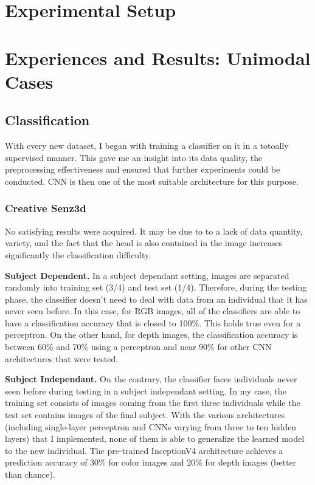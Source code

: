 \section{Experimental Setup}

\section{Experiences and Results: Unimodal Cases}

\subsection{Classification}

With every new dataset, I began with training a classifier on it in a
totoally supervised manner.
This gave me an insight into its data quality, the preprocessing
effectiveness and ensured that further experiments could be conducted.
CNN is then one of the most suitable architecture for this purpose.

\subsubsection{Creative Senz3d}

No satisfying results were acquired. It may be due to to a lack of data
quantity, variety, and the fact that the head is also contained in the
image increases significantly the classification difficulty.

\textbf{Subject Dependent.}
In a subject dependant setting, images are separated randomly into
training set (3/4) and test set (1/4). Therefore, during the
testing phase, the classifier doesn't need to deal with data from an
individual that it has never seen before.
In this case, for RGB images, all of the classifiers are able to
have a classification accuracy that is closed to 100\%. This holds true
even for a perceptron.
On the other hand, for depth images, the classification accuracy is
between 60\% and 70\% using a perceptron and near 90\% for other CNN
architectures that were tested.

\textbf{Subject Independant.}
On the contrary, the classifier faces individuals never seen before
during testing in a subject independant setting. 
In my case, the training set consists of images coming from the
first three individuals while the test set contains images of
the final subject.
With the various architectures (including single-layer perceptron
and CNNs varying from three to ten hidden layers)
that I implemented, none of them is able to generalize the learned model
to the new individual.
The pre-trained InceptionV4 architecture achieves a prediction accuracy
of 30\% for color images and 20\% for depth images (better than chance).

